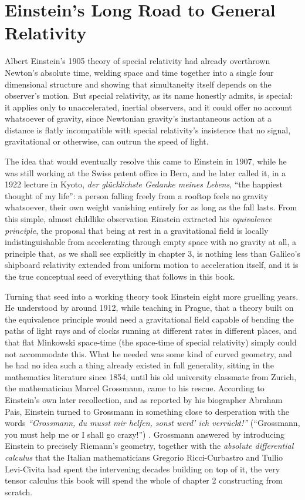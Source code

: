 \section{Einstein's Long Road to General Relativity}

    Albert Einstein's 1905 theory of special relativity had already overthrown Newton's absolute time, welding space and time together into a single four dimensional structure and showing that simultaneity itself depends on the observer's motion. But special relativity, as its name honestly admits, is special: it applies only to unaccelerated, inertial observers, and it could offer no account whatsoever of gravity, since Newtonian gravity's instantaneous action at a distance is flatly incompatible with special relativity's insistence that no signal, gravitational or otherwise, can outrun the speed of light.

    The idea that would eventually resolve this came to Einstein in 1907, while he was still working at the Swiss patent office in Bern, and he later called it, in a 1922 lecture in Kyoto, \textit{der gl\"{u}cklichste Gedanke meines Lebens}, ``the happiest thought of my life'': a person falling freely from a rooftop feels no gravity whatsoever, their own weight vanishing entirely for as long as the fall lasts. From this simple, almost childlike observation Einstein extracted his \textit{equivalence principle}, the proposal that being at rest in a gravitational field is locally indistinguishable from accelerating through empty space with no gravity at all, a principle that, as we shall see explicitly in chapter 3, is nothing less than Galileo's shipboard relativity extended from uniform motion to acceleration itself, and it is the true conceptual seed of everything that follows in this book.

    Turning that seed into a working theory took Einstein eight more gruelling years. He understood by around 1912, while teaching in Prague, that a theory built on the equivalence principle would need a gravitational field capable of bending the paths of light rays and of clocks running at different rates in different places, and that flat Minkowski space-time (the space-time of special relativity) simply could not accommodate this. What he needed was some kind of curved geometry, and he had no idea such a thing already existed in full generality, sitting in the mathematics literature since 1854, until his old university classmate from Zurich, the mathematician Marcel Grossmann, came to his rescue. According to Einstein's own later recollection, and as reported by his biographer Abraham Pais, Einstein turned to Grossmann in something close to desperation with the words \textit{``Grossmann, du musst mir helfen, sonst werd' ich verr\"{u}ckt!''} (``Grossmann, you must help me or I shall go crazy!'') \citep{pais1982}. Grossmann answered by introducing Einstein to precisely Riemann's geometry, together with the \textit{absolute differential calculus} that the Italian mathematicians Gregorio Ricci-Curbastro and Tullio Levi-Civita had spent the intervening decades building on top of it, the very tensor calculus this book will spend the whole of chapter 2 constructing from scratch.

